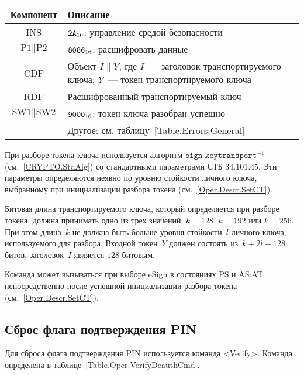 \begin{table}[hbt]
\caption{}\label{Table.Oper.DecipherCmd}
\begin{tabular}{|c|p{14cm}|}
\hline
Компонент & Описание\\ 
\hline
\hline
INS & $\texttt{2A}_{16}$: управление средой безопасности \\
\hline
$\text{P1} \parallel \text{P2}$ & $\texttt{8086}_{16}$: расшифровать
данные \\ 
\hline
CDF & Объект $I \parallel Y$, где $I$~--- заголовок транспортируемого ключа, 
$Y$~--- токен транспортируемого ключа \\
\hline 
\hline
RDF &  Расшифрованный транспортируемый ключ\\
\hline
$\text{SW1} \parallel \text{SW2}$ & $\texttt{9000}_{16}$: токен ключа 
разобран успешно\\
\cline{2-2}
& Другое: см. таблицу~\ref{Table.Errors.General} \\
\hline
\end{tabular}
\end{table}

При разборе токена ключа используется алгоритм $\texttt{bign-keytransport}^{-1}$
(см.~\ref{CRYPTO.StdAlg}) со стандартными параметрами СТБ 34.101.45.
%
Эти параметры определяются неявно по уровню стойкости личного ключа,
выбранному при инициализации разбора токена (см.~\ref{Oper.Descr.SetCT}).

Битовая длина транспортируемого ключа, который определяется при разборе токена, 
должна принимать одно из трех значений: $k=128$, $k=192$ или $k=256$. 
При этом длина~$k$ не должна быть больше уровня стойкости~$l$ личного ключа, 
используемого для разбора. 
%
Входной токен~$Y$ должен состоять из~$k+2l+128$ битов,
заголовок~$I$ является $128$-битовым.

Команда может вызываться при выборе eSign в состояниях 
PS и AS:AT непосредственно после успешной инициализации 
разбора токена (см.~\ref{Oper.Descr.SetCT}).

\subsection{Сброс флага подтверждения PIN}
\label{Oper.Descr.VerifyDeauth}

Для сброса флага подтверждения PIN используется команда <Verify>.
Команда определена в таблице~\ref{Table.Oper.VerifyDeauthCmd}.


